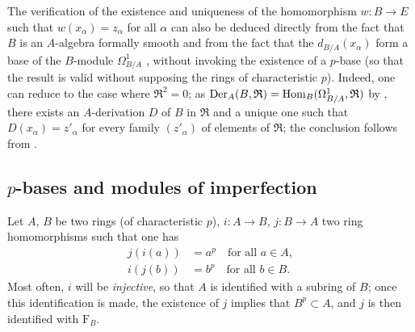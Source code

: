 \begin{remark}[21.2.8]
\label{0.21.2.8}
The verification of the existence and uniqueness of the homomorphism $w:B\to E$ such that $w(x_\alpha)=z_\alpha$ for all $\alpha$ can also be deduced directly from the fact that $B$ is an $A$-algebra formally smooth and from the fact that the $d_{B/A}(x_\alpha)$ form a base of the $B$-module $\Omega^1_{B/A}$ , without invoking the existence of a $p$-base (so that the result is valid without supposing the rings of characteristic $p$).
Indeed, one can reduce to the case where $\mathfrak{R}^2=0$; as $\operatorname{Der}_A(B,\mathfrak{R})=\operatorname{Hom}_B(\Omega^1_{B/A},\mathfrak{R})$ by , there exists an $A$-derivation $D$ of $B$ in $\mathfrak{R}$ and a unique one such that $D(x_\alpha)=z'_\alpha$ for every family $(z'_\alpha)$ of elements of $\mathfrak{R}$; the conclusion follows from .
\end{remark}

\subsection{\texorpdfstring{$p$}{p}-bases and modules of imperfection}
\label{subsection:0.21.3}

\begin{env}[21.3.1]
\label{0.21.3.1}
Let $A$, $B$ be two rings (of characteristic $p$), $i:A\to B$, $j:B\to A$ two ring homomorphisms such that one has
\begin{align}
\tag{21.3.1.1}
  \label{0.21.3.1.1}
  j(i(a))&=a^p \quad\text{for all } a\in A, \\
\tag{21.3.1.2}
  \label{0.21.3.1.2}
  i(j(b))&=b^p \quad\text{for all } b\in B.
\end{align}
Most often, $i$ will be \emph{injective}, so that $A$ is identified with a subring of $B$; once this identification is made, the existence of $j$ implies that $B^p\subset A$, and $j$ is then identified with $\mathrm{F}_B$.
\end{env}

